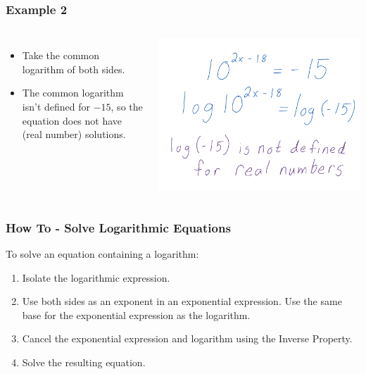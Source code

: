 \documentclass[aspectratio=169,17pt]{beamer}
\begin{document}
\begin{frame}
	\frametitle{Example 2}
	\begin{columns}
		\begin{itemize} \small
			\item Take the common logarithm of both sides. \vspace{\fill}
			\item The common logarithm isn't defined for $-15$, 
			so the equation does not have (real number) solutions.
		\end{itemize}
			\includegraphics[width=\textwidth]{logarithmic_equations-work_05.png}
	\end{columns}
\end{frame}

\begin{frame}
	\frametitle{How To - Solve Logarithmic Equations}
	To solve an equation containing a logarithm: \pause
	\begin{enumerate}
		\item Isolate the logarithmic expression. \pause
		\item Use both sides as an exponent in an exponential expression. Use the same base for the exponential expression as the logarithm. \pause
		\item Cancel the exponential expression and logarithm using the Inverse Property. \pause
		\item Solve the resulting equation.
	\end{enumerate}
\end{frame}
\end{document}
